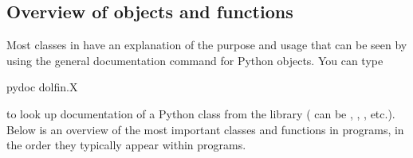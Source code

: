 \subsection{Overview of objects and functions}

Most classes in \fenics{} have an explanation of the purpose and usage
that can be seen by using the general documentation command 
for Python objects. You can type
\begin{progoutput}
pydoc dolfin.X
\end{progoutput}
%
to look up documentation of a Python class  from the \dolfin{}
library ( can be , , ,
etc.). Below is an overview of the most important classes and functions
in \fenics{} programs, in the order they typically appear within
programs.
%
